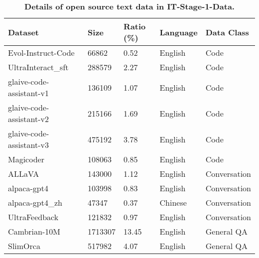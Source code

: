 \begin{table}[h]
\centering
\caption{\textbf{Details of open source text data in IT-Stage-1-Data.}
}
\label{tab:appendix_sft_s1_nlp}
\setlength{\tabcolsep}{7pt}
\begin{tabular}{l|l|l|l|l}
\toprule
Dataset                            & Size    & Ratio (\%) & Language & Data Class   \\
\midrule
Evol-Instruct-Code~\cite{luo2023wizardcoder}                 & 66862   & 0.52     & English  & Code         \\
UltraInteract\_sft~\cite{yuan2024advancing}                 & 288579  & 2.27     & English  & Code         \\
glaive-code-assistant-v1~\cite{glaive-code-assistant}           & 136109  & 1.07     & English  & Code         \\
glaive-code-assistant-v2~\cite{glaive-code-assistant}           & 215166  & 1.69     & English  & Code         \\
glaive-code-assistant-v3~\cite{glaive-code-assistant}           & 475192  & 3.78     & English  & Code         \\
Magicoder~\cite{wei2024magicoder}                          & 108063  & 0.85     & English  & Code         \\
ALLaVA~\cite{chen2024allava}                             & 143000  & 1.12     & English  & Conversation \\
alpaca-gpt4~\cite{peng2023instruction}                        & 103998   & 0.83     & English  & Conversation \\
alpaca-gpt4\_zh~\cite{peng2023instruction}                    & 47347   & 0.37     & Chinese  & Conversation \\
UltraFeedback~\cite{cui2023ultrafeedback}                      & 121832   & 0.97     & English  & Conversation \\
Cambrian-10M~\cite{tong2024cambrian1}                       & 1713307 & 13.45    & English  & General QA   \\
SlimOrca~\cite{SlimOrca}                           & 517982  & 4.07     & English  & General QA   \\

\end{tabular}
\end{table}
